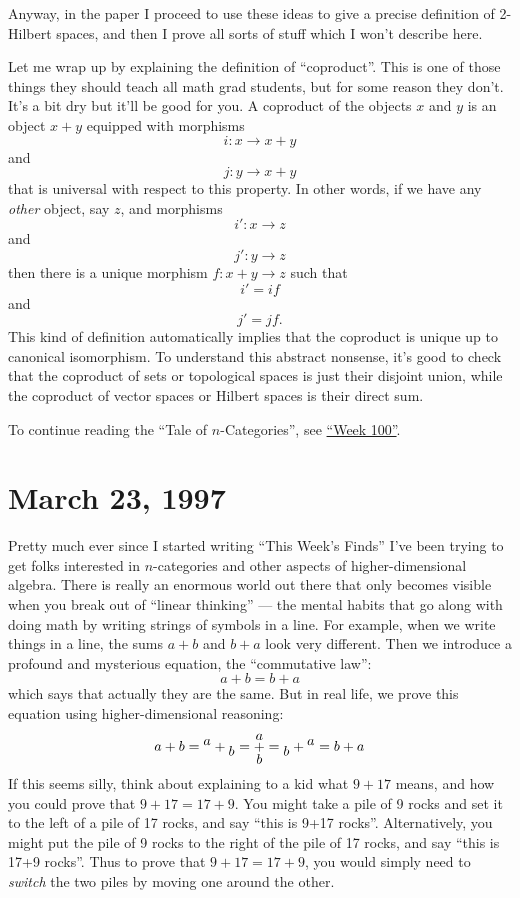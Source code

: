 \documentclass{article}
\begin{document}
Anyway, in the paper I proceed to use these ideas to give a precise
definition of 2-Hilbert spaces, and then I prove all sorts of stuff
which I won't describe here.

Let me wrap up by explaining the definition of ``coproduct''. This is
one of those things they should teach all math grad students, but for
some reason they don't. It's a bit dry but it'll be good for you. A
coproduct of the objects \(x\) and \(y\) is an object \(x+y\) equipped
with morphisms \[i\colon x \to x+y\] and \[j\colon y \to x+y\] that is
universal with respect to this property. In other words, if we have any
\emph{other} object, say \(z\), and morphisms \[i'\colon x \to z\] and
\[j'\colon y \to z\] then there is a unique morphism
\(f\colon x+y \to z\) such that \[i' = if\] and \[j' = jf.\] This kind
of definition automatically implies that the coproduct is unique up to
canonical isomorphism. To understand this abstract nonsense, it's good
to check that the coproduct of sets or topological spaces is just their
disjoint union, while the coproduct of vector spaces or Hilbert spaces
is their direct sum.

To continue reading the ``Tale of \(n\)-Categories'', see
\protect\hyperlink{week100}{``Week 100''}.



\hypertarget{week100}{%
\section{March 23, 1997}\label{week100}}

Pretty much ever since I started writing ``This Week's Finds'' I've been
trying to get folks interested in \(n\)-categories and other aspects of
higher-dimensional algebra. There is really an enormous world out there
that only becomes visible when you break out of ``linear thinking'' ---
the mental habits that go along with doing math by writing strings of
symbols in a line. For example, when we write things in a line, the sums
\(a+b\) and \(b+a\) look very different. Then we introduce a profound
and mysterious equation, the ``commutative law'': \[a + b = b + a\]
which says that actually they are the same. But in real life, we prove
this equation using higher-dimensional reasoning:
\[a+b = {}^{\mbox{\normalfont $a$}}+{}_{\mbox{\normalfont $b$}} = \underset{{\mbox{\normalfont $b$}}}{\overset{{\mbox{\normalfont $a$}}}{+}} = {}_{{\mbox{\normalfont $b$}}}+{}^{{\mbox{\normalfont $a$}}} = b+a\]
If this seems silly, think about explaining to a kid what \(9+17\)
means, and how you could prove that \(9+17 = 17+9\). You might take a
pile of 9 rocks and set it to the left of a pile of 17 rocks, and say
``this is 9+17 rocks''. Alternatively, you might put the pile of 9 rocks
to the right of the pile of 17 rocks, and say ``this is 17+9 rocks''.
Thus to prove that \(9+17=17+9\), you would simply need to \emph{switch}
the two piles by moving one around the other.
\end{document}
